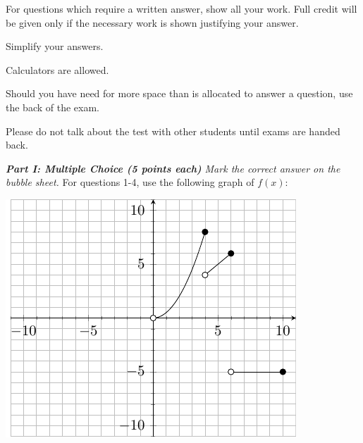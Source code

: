 \documentclass[11pt]{article}
\begin{document}
\Head
\begin{instructions}
\item For questions which require a written answer, show all your work.  Full credit will be given only if the necessary work is shown justifying your answer.
\item Simplify your answers.
\item Calculators are allowed.
\item Should you have need for more space than is allocated to answer a question, use the back of the exam.
\item Please do not talk about the test with other students until exams are handed back.
\end{instructions}
\nextpage

\vspace{.2in}

\noindent \emph{{\bf Part I: Multiple Choice (5 points each)} Mark the correct
answer on the bubble sheet.}
For questions 1-4, use the following graph of $f(x)$:\\


\begin{minipage}{\linewidth}%
\centering
\makebox[\linewidth]{}
\includegraphics{exam1graph1.pdf}
\label{graph1exam1}%
\end{minipage}
\end{document}

